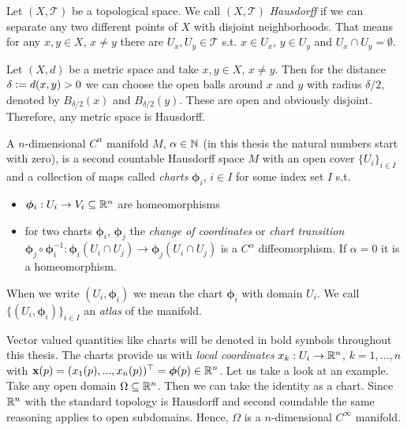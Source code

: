 \documentclass[../master_thesis.tex]{subfiles}
\begin{document}
\begin{definition}
    Let $(X, \mathcal{T})$ be a topological space. We call $(X, \mathcal{T})$
    \textit{Hausdorff} if we can separate any two different points of $X$
    with disjoint neighborhoods. That means for any $x,y \in X$, 
    $x\neq y$ there are $U_x, U_y \in \mathcal{T}$ s.t. 
    $x \in U_x$, $y \in U_y$ and $U_x \cap U_y = \emptyset$.
\end{definition}

\begin{example}
    Let $(X,d)$ be a metric space and take 
    $x,y \in X$, $x\neq y$. Then for the distance 
    $\delta \vcentcolon= d(x,y) > 0$ we can choose the open balls around $x$ and 
    $y$ with radius 
    $\delta/2$, denoted by $B_{\delta/2}(x)$ and $B_{\delta/2}(y)$. These are 
    open and obviously disjoint. Therefore, any metric space is Hausdorff. 
\end{example}

\begin{definition}[Manifold]
    A $n$-dimensional $C^\alpha$ manifold $M$, $\alpha \in \mathbb{N}$ (in this thesis 
    the natural numbers start with zero), 
    is a second countable Hausdorff 
    space $M$ with an open cover $\{ U_i \} _{i\in I}$
    and a collection of maps called \textit{charts} $\boldsymbol{\phi}_i$, $i\in I$ for 
    some index set $I$ s.t.
    \begin{itemize}
        \item $\boldsymbol{\phi}_i: U_i \rightarrow V_i \subseteq \mathbb{R}^{n}$
            are homeomorphisms
        \item for two charts $\boldsymbol{\phi}_i$, $\boldsymbol{\phi}_j$ the 
            \textit{change of coordinates} or 
            \textit{chart transition} $\boldsymbol{\phi}_j \circ \boldsymbol{\phi}_i^{-1}: 
            \boldsymbol{\phi}_i(U_i \cap U_j) \rightarrow \boldsymbol{\phi}_j(U_i \cap U_j)$ 
            is a $C^\alpha$ diffeomorphism. If $\alpha=0$ it is a homeomorphism.
    \end{itemize}
    When we write $(U_i, \bm{\phi}_i)$ we mean the chart $\bm{\phi}_i$ with domain $U_i$.
    We call $\{ (U_i, \bm{\phi}_i) \}_{i \in I}$ an \textit{atlas} of the manifold.
\end{definition}
Vector valued quantities like charts will be denoted in bold symbols throughout this thesis.
The charts provide us with \textit{local coordinates} $x_k: U_i \rightarrow \mathbb{R}^n$,
$k = 1, ..., n$ with $\mathbf{x}(p) = (x_1(p),...,x_n(p))^\top = \boldsymbol{\phi}(p) \in \mathbb{R}^n$.
Let us take a look at an example. Take any open domain 
$\Omega \subseteq \mathbb{R}^n$. Then we can take the identity as a chart.
Since $\mathbb{R}^n$ with the standard topology is Hausdorff and second coundable
the same reasoning applies to open subdomains. Hence, $\Omega$ is a 
$n$-dimensional $C^\infty$ manifold. 
\end{document}
